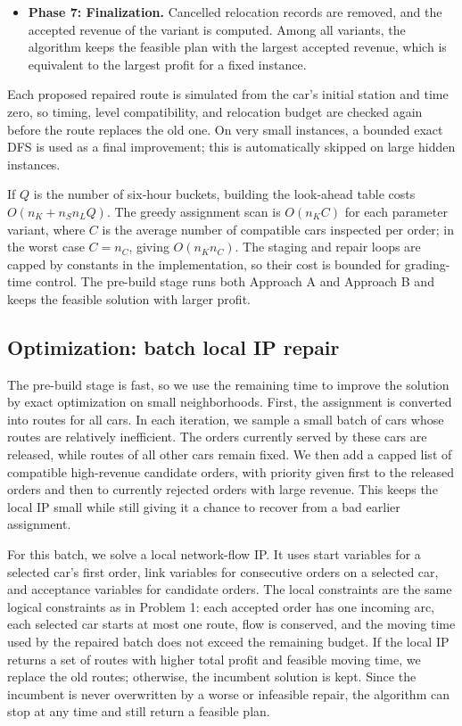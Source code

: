\documentclass[10pt,a4paper]{article}
\begin{document}
\begin{itemize}
    \item \textbf{Phase 7: Finalization.} Cancelled relocation records are
    removed, and the accepted revenue of the variant is computed.  Among all
    variants, the algorithm keeps the feasible plan with the largest accepted
    revenue, which is equivalent to the largest profit for a fixed instance.
\end{itemize}

Each proposed repaired route is simulated from the car's initial station and
time zero, so timing, level compatibility, and relocation budget are checked
again before the route replaces the old one.  On very small instances, a bounded
exact DFS is used as a final improvement; this is automatically skipped on large
hidden instances.

If $Q$ is the number of six-hour buckets, building the look-ahead table costs
$O(n_K+n_Sn_LQ)$.  The greedy assignment scan is $O(n_KC)$ for each parameter
variant, where $C$ is the average number of compatible cars inspected per order;
in the worst case $C=n_C$, giving $O(n_Kn_C)$.  The staging and repair loops are
capped by constants in the implementation, so their cost is bounded for
grading-time control.  The pre-build stage runs both Approach A and Approach B
and keeps the feasible solution with larger profit.

\subsection*{Optimization: batch local IP repair}

The pre-build stage is fast, so we use the remaining time to improve the
solution by exact optimization on small neighborhoods.  First, the assignment is
converted into routes for all cars.  In each iteration, we sample a small batch
of cars whose routes are relatively inefficient.  The orders currently served by
these cars are released, while routes of all other cars remain fixed.  We then
add a capped list of compatible high-revenue candidate orders, with priority
given first to the released orders and then to currently rejected orders with
large revenue.  This keeps the local IP small while still giving it a chance to
recover from a bad earlier assignment.

For this batch, we solve a local network-flow IP.  It uses start variables for a
selected car's first order, link variables for consecutive orders on a selected
car, and acceptance variables for candidate orders.  The local constraints are
the same logical constraints as in Problem 1: each accepted order has one
incoming arc, each selected car starts at most one route, flow is conserved, and
the moving time used by the repaired batch does not exceed the remaining budget.
If the local IP returns a set of routes with higher total profit and feasible
moving time, we replace the old routes; otherwise, the incumbent solution is
kept.  Since the incumbent is never overwritten by a worse or infeasible repair,
the algorithm can stop at any time and still return a feasible plan.
\end{document}
